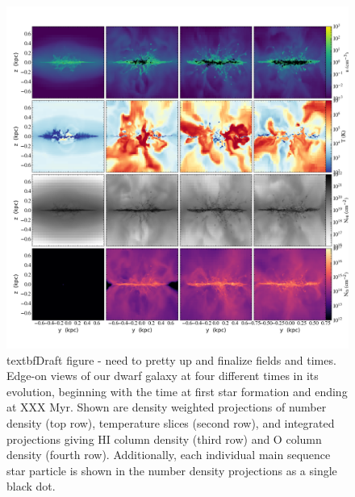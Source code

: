 \documentclass[twocolumn]{aastex61}
\begin{document}
\begin{figure}
\centering
\includegraphics[width=0.975\linewidth]{multiplot_4x4_x.png}
\caption{textbf{Draft figure - need to pretty up and finalize fields and times.} Edge-on views of our dwarf galaxy at four different times in its evolution, beginning with the time at first star formation and ending at XXX Myr. Shown are density weighted projections of number density (top row), temperature slices (second row), and integrated projections giving HI column density (third row) and O column density (fourth row). Additionally, each individual main sequence star particle is shown in the number density projections as a single black dot.}
\label{fig:panel_x}
\end{figure}
\end{document}
